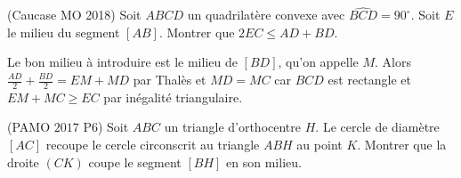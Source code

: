 \begin{exo}
(Caucase MO 2018) Soit $ABCD$ un quadrilatère convexe avec $\widehat{BCD}=90^\circ$. Soit $E$ le milieu du segment $[AB]$. Montrer que $2EC\leq AD+BD$.
\end{exo}


\begin{sol}
Le bon milieu à introduire est le milieu de $[BD]$, qu'on appelle $M$. Alors $\frac{AD}{2}+\frac{BD}{2}=EM+MD$ par Thalès et $MD=MC$ car $BCD$ est rectangle et $EM+MC\geq EC$ par inégalité triangulaire.
\end{sol}


\begin{exo}
(PAMO $2017$ P$6$)
Soit $ABC$ un triangle d'orthocentre $H$. Le cercle de diam\`etre $[AC]$ recoupe le cercle circonscrit au triangle $ABH$ au point $K$. Montrer que la droite $(CK)$ coupe le segment $[BH]$ en son milieu.
\end{exo}


